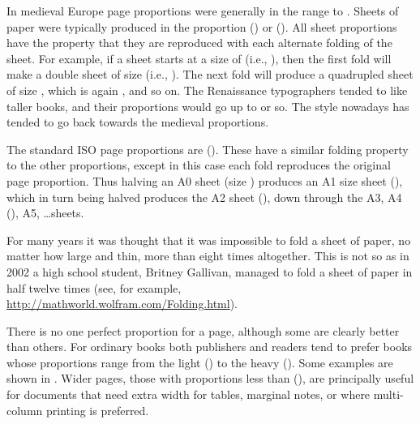 \documentclass[10pt,letterpaper,extrafontsizes]{memoir}
\begin{document}
    In medieval Europe page proportions were generally in the range
 to . Sheets of paper were typically 
produced in the
proportion  () or  
(). 
All sheet proportions
have the property that they are reproduced with each alternate
folding of the sheet.
For example, if a sheet starts at a size of  
(i.e., ),
then the first fold will make a double sheet of size 
(i.e., ). The next fold will produce a quadrupled sheet of size
, which is again , and so on. 
 The Renaissance typographers tended to like taller books, and their 
proportions would go up to 
or so. The style nowadays has tended to go back towards the medieval
proportions.

    The standard ISO page proportions are 
 (). These
have a similar folding property to the other proportions, except in this case
each fold reproduces the original page proportion.
Thus halving an A0 sheet 
(size ) produces an A1 size sheet (),
which in turn being halved produces the A2 sheet (), down
through the A3, A4 (), A5, \ldots sheets.

For many years it was thought that it was impossible to fold a sheet of 
paper, no matter how large and thin, more than eight times 
altogether. This is not so as in 2002 a high school student, Britney Gallivan,
managed to fold a sheet of paper in half twelve times (see, for example,
\url{http://mathworld.wolfram.com/Folding.html}).


   There is no one perfect proportion for a page, 
although some are clearly better
than others. For ordinary books both publishers and readers tend to prefer
books whose proportions range from the light 
 () to the heavy
 (). Some examples are shown in .
 Wider pages, those with proportions less than
 (),
are principally useful for documents that need
extra width for tables, marginal notes, 
or where multi-column printing is preferred. 
\end{document}
